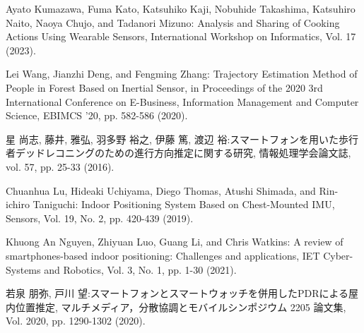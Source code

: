 \begin{thebibliography}{参考文献}
	Ayato Kumazawa, Fuma Kato, Katsuhiko Kaji, Nobuhide Takashima, Katsuhiro Naito, Naoya Chujo, and Tadanori Mizuno:
	Analysis and Sharing of Cooking Actions Using Wearable Sensors, International Workshop on Informatics, Vol. 17 (2023).

	Lei Wang, Jianzhi Deng, and Fengming Zhang: Trajectory Estimation Method of People in Forest Based on Inertial Sensor, in Proceedings of the 2020 3rd International Conference on E-Business, Information Management and Computer Science, EBIMCS ’20, pp. 582-586 (2020).

	星 尚志, 藤井, 雅弘, 羽多野 裕之, 伊藤 篤, 渡辺 裕:スマートフォンを用いた歩行者デッドレコニングのための進行方向推定に関する研究, 情報処理学会論文誌, vol. 57, pp. 25-33 (2016).

	Chuanhua Lu, Hideaki Uchiyama, Diego Thomas, Atushi Shimada, and Rin-ichiro Taniguchi: Indoor Positioning System Based on Chest-Mounted IMU, Sensors, Vol. 19, No. 2, pp. 420-439 (2019).

	Khuong An Nguyen, Zhiyuan Luo, Guang Li, and Chris Watkins: A review of smartphones-based indoor positioning: Challenges and applications, IET Cyber-Systems and Robotics, Vol. 3, No. 1, pp. 1-30 (2021).

	若泉 朋弥, 戸川 望:スマートフォンとスマートウォッチを併用したPDRによる屋内位置推定, マルチメディア，分散協調とモバイルシンポジウム 2205 論文集, Vol. 2020, pp. 1290-1302 (2020).



\end{thebibliography}

